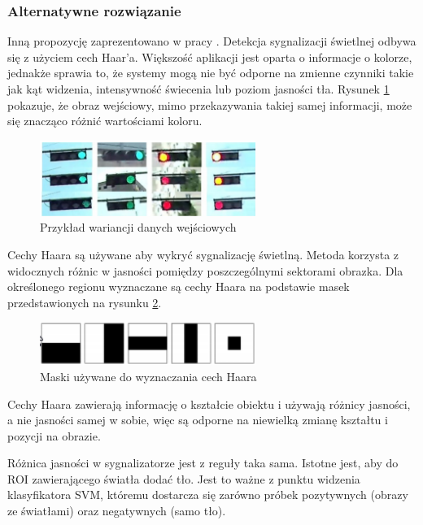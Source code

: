 \subsubsection{Alternatywne rozwiązanie}

Inną propozycję zaprezentowano w pracy \cite{T9}. 
Detekcja sygnalizacji świetlnej odbywa się z użyciem cech Haar'a.
Większość aplikacji jest oparta o informacje o kolorze, jednakże sprawia to, że systemy mogą nie być odporne na zmienne czynniki takie jak kąt widzenia, intensywność świecenia lub poziom jasności tła.
Rysunek \ref{fig:traffic_light2_input} pokazuje, że obraz wejściowy, mimo przekazywania takiej samej informacji, może się znacząco różnić wartościami koloru.

\begin{figure}
  \centering
  \includegraphics[width=7cm]{img/traffic_light2_input.png}
  \caption{Przykład wariancji danych wejściowych\cite{T9}}
  \label{fig:traffic_light2_input}
\end{figure}

Cechy Haara są używane aby wykryć sygnalizację świetlną. 
Metoda korzysta z widocznych różnic w jasności pomiędzy poszczególnymi sektorami obrazka.
Dla określonego regionu wyznaczane są cechy Haara na podstawie masek przedstawionych na rysunku \ref{fig:maski_maseczki}.

\begin{figure}
  \centering
  \includegraphics[width=7cm]{img/maski_maseczki.png}
  \caption{Maski używane do wyznaczania cech Haara\cite{T9}}
  \label{fig:maski_maseczki}
\end{figure}

Cechy Haara zawierają informację o kształcie obiektu i używają różnicy jasności, a nie jasności samej w sobie, więc są odporne na niewielką zmianę kształtu  i pozycji na obrazie.

Różnica jasności w sygnalizatorze jest z reguły taka sama. 
Istotne jest, aby do ROI zawierającego światła dodać tło. 
Jest to ważne z punktu widzenia klasyfikatora SVM, któremu dostarcza się zarówno próbek pozytywnych (obrazy ze światłami) oraz negatywnych (samo tło).

